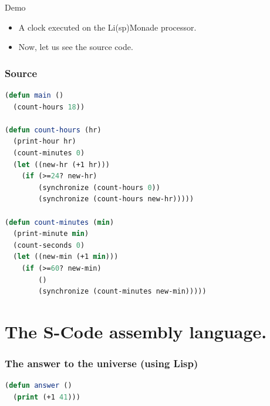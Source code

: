 \documentclass{beamer}
\begin{document}
\begin{frame}{Demo}
\begin{itemize}
\item A clock executed on the Li(sp)Monade processor.
\pause
\item Now, let us see the source code.
\end{itemize}
\end{frame}

\begin{frame}[fragile]
\frametitle{Source}
\begin{lstlisting}[language=Lisp,basicstyle=\scriptsize]
(defun main ()
  (count-hours 18))

(defun count-hours (hr)
  (print-hour hr) 
  (count-minutes 0)
  (let ((new-hr (+1 hr)))
    (if (>=24? new-hr)
        (synchronize (count-hours 0)) 
        (synchronize (count-hours new-hr)))))

(defun count-minutes (min)
  (print-minute min)
  (count-seconds 0)
  (let ((new-min (+1 min)))
    (if (>=60? new-min)
        ()  
        (synchronize (count-minutes new-min)))))
\end{lstlisting}

\end{frame}

\section{The S-Code assembly language.}

\begin{frame}[fragile]
\frametitle{The answer to the universe (using Lisp)}
\begin{lstlisting}[language=Lisp]
(defun answer () 
  (print (+1 41)))
\end{lstlisting}
\end{frame}
\end{document}
